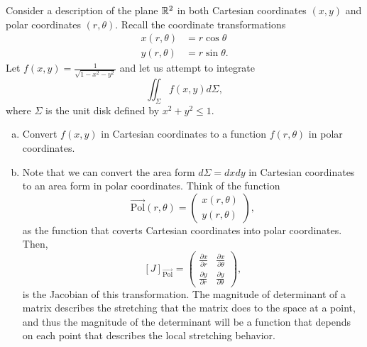 \documentclass[12pt]{article} %
\begin{document}
\vspace*{1cm}
\begin{problem}
    Consider a description of the plane $\mathbb{R}^2$ in both Cartesian coordinates $(x,y)$ and polar coordinates $(r,\theta)$.  Recall the coordinate transformations
    \begin{align*}
        x(r,\theta)&= r\cos \theta\\
        y(r,\theta)&= r\sin \theta.
    \end{align*}
    Let $f(x,y) = \frac{1}{\sqrt{1-x^2-y^2}}$ and let us attempt to integrate
    \[
    \iint_{\Sigma} f(x,y)d\Sigma,
    \]
    where $\Sigma$ is the unit disk defined by $x^2+y^2\leq 1$.
    \begin{enumerate}[(a)]
        \item Convert $f(x,y)$ in Cartesian coordinates to a function $f(r,\theta)$ in polar coordinates.
        \item Note that we can convert the area form $d\Sigma=dxdy$ in Cartesian coordinates to an area form in polar coordinates.  Think of the function
        \[
        \vec{\textrm{Pol}}(r,\theta) = \begin{pmatrix} x(r,\theta) \\ y(r,\theta) \end{pmatrix},
        \]
        as the function that coverts Cartesian coordinates into polar coordinates.  Then, 
        \[
        [J]_{\vec{\textrm{Pol}}} = \begin{pmatrix} \frac{\partial x}{\partial r} & \frac{\partial x}{\partial \theta} \\ \frac{\partial y}{\partial r} & \frac{\partial y}{\partial \theta} \end{pmatrix},
        \]
        is the Jacobian of this transformation. The magnitude of determinant of a matrix describes the stretching that the matrix does to the space at a point, and thus the magnitude of the determinant will be a function that depends on each point that describes the local stretching behavior.
        

\end{enumerate}
\end{problem}
\end{document}
